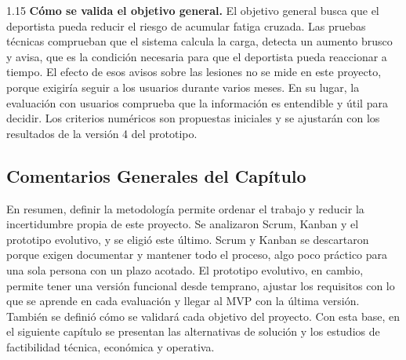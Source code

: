 \begin{spacing}{1.15}
\textbf{Cómo se valida el objetivo general.} El objetivo general busca que el deportista pueda reducir el riesgo de acumular fatiga cruzada. Las pruebas técnicas comprueban que el sistema calcula la carga, detecta un aumento brusco y avisa, que es la condición necesaria para que el deportista pueda reaccionar a tiempo. El efecto de esos avisos sobre las lesiones no se mide en este proyecto, porque exigiría seguir a los usuarios durante varios meses. En su lugar, la evaluación con usuarios comprueba que la información es entendible y útil para decidir. Los criterios numéricos son propuestas iniciales y se ajustarán con los resultados de la versión 4 del prototipo.

\subsection{Comentarios Generales del Capítulo}

En resumen, definir la metodología permite ordenar el trabajo y reducir la incertidumbre propia de este proyecto. Se analizaron Scrum, Kanban y el prototipo evolutivo, y se eligió este último. Scrum y Kanban se descartaron porque exigen documentar y mantener todo el proceso, algo poco práctico para una sola persona con un plazo acotado. El prototipo evolutivo, en cambio, permite tener una versión funcional desde temprano, ajustar los requisitos con lo que se aprende en cada evaluación y llegar al MVP con la última versión. También se definió cómo se validará cada objetivo del proyecto. Con esta base, en el siguiente capítulo se presentan las alternativas de solución y los estudios de factibilidad técnica, económica y operativa.
\end{spacing}
